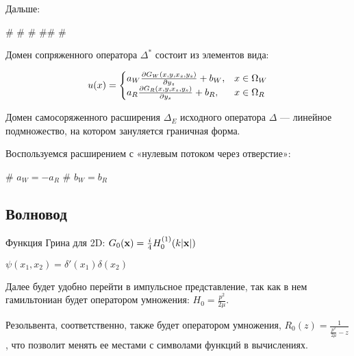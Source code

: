 Дальше:

\begin{elist}
# 
# 
# 
## 
# 
\end{elist}


Домен сопряженного оператора $\Delta^*$ состоит из элементов вида:

\[
u(x) = \begin{cases}
a_W \pdv{G_W(x, y, x_s, y_s)}{y_s} (x_s = x_0, x_s = y_0) + b_W, & x \in \Omega_W \\
a_R \pdv{G_R(x, y, x_s, y_s)}{y_s} (x_s = x_0, x_s = y_0) + b_R, & x \in \Omega_R \\
\end{cases}
\]

Домен самосоряженного расширения $\Delta_E$ исходного оператора $\Delta$ — линейное подмножество, на котором зануляется граничная форма. 


Воспользуемся расширением с «нулевым потоком через отверстие»:

\begin{ilist}
# $a_W = -a_R$
# $b_W = b_R$
\end{ilist}

\subsection{Волновод}







Функция Грина для 2D: $G_0(\vb{x}) = \frac{i}{4} H_0^{(1)}(k |\vb{x}|)$




$\psi(x_1, x_2) = \delta'(x_1) \delta(x_2)$

Далее будет удобно перейти в импульсное представление, так как в нем гамильтониан будет оператором умножения: $H_0 = \frac{p^2}{2 \mu}$.

Резольвента, соответственно, также будет оператором умножения, $R_0(z) = \frac{1}{\frac{p^2}{2 \mu} - z}$, что позволит менять ее местами с символами функций в вычислениях.

